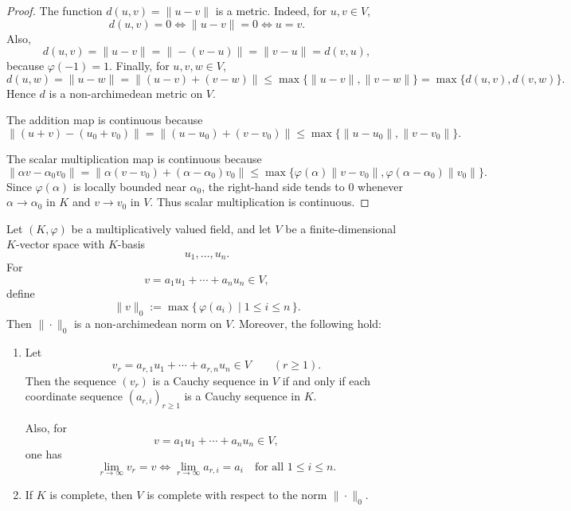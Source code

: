 \begin{proof}
    The function \(d(u,v)=\|u-v\|\) is a metric. Indeed, for \(u,v\in V\),
    \[
        d(u,v)=0
        \Longleftrightarrow
        \|u-v\|=0
        \Longleftrightarrow
        u=v.
    \]
    Also,
    \[
        d(u,v)=\|u-v\|=\|-(v-u)\|=\|v-u\|=d(v,u),
    \]
    because \(\varphi(-1)=1\). Finally, for \(u,v,w\in V\),
    \[
        d(u,w)
        =
        \|u-w\|
        =
        \|(u-v)+(v-w)\|
        \leq
        \max\{\|u-v\|,\|v-w\|\}
        =
        \max\{d(u,v),d(v,w)\}.
    \]
    Hence \(d\) is a non-archimedean metric on \(V\).

    The addition map is continuous because
    \[
        \|(u+v)-(u_0+v_0)\|
        =
        \|(u-u_0)+(v-v_0)\|
        \leq
        \max\{\|u-u_0\|,\|v-v_0\|\}.
    \]

    The scalar multiplication map is continuous because
    \[
        \|\alpha v-\alpha_0v_0\|
        =
        \|\alpha(v-v_0)+(\alpha-\alpha_0)v_0\|
        \leq
        \max\{\varphi(\alpha)\|v-v_0\|,
               \varphi(\alpha-\alpha_0)\|v_0\|\}.
    \]
    Since \(\varphi(\alpha)\) is locally bounded near \(\alpha_0\), the right-hand side
    tends to \(0\) whenever \(\alpha\to\alpha_0\) in \(K\) and \(v\to v_0\) in \(V\).
    Thus scalar multiplication is continuous.
\end{proof}

\begin{lemma}
    Let \((K,\varphi)\) be a multiplicatively valued field, and let \(V\) be a
    finite-dimensional \(K\)-vector space with \(K\)-basis
    \[
        u_1,\dots,u_n.
    \]
    For
    \[
        v=a_1u_1+\cdots+a_nu_n\in V,
    \]
    define
    \[
        \|v\|_0:=\max\{\,\varphi(a_i)\mid 1\leq i\leq n\,\}.
    \]
    Then \(\|\cdot\|_0\) is a non-archimedean norm on \(V\). Moreover, the following
    hold:
    \begin{enumerate}
        \item Let
              \[
                  v_r=a_{r,1}u_1+\cdots+a_{r,n}u_n\in V
                  \qquad (r\geq 1).
              \]
              Then the sequence \((v_r)\) is a Cauchy sequence in \(V\) if and only if
              each coordinate sequence \((a_{r,i})_{r\geq 1}\) is a Cauchy sequence in
              \(K\).

              Also, for
              \[
                  v=a_1u_1+\cdots+a_nu_n\in V,
              \]
              one has
              \[
                  \lim_{r\to\infty} v_r=v
                  \Longleftrightarrow
                  \lim_{r\to\infty} a_{r,i}=a_i
                  \quad\text{for all }1\leq i\leq n.
              \]

        \item If \(K\) is complete, then \(V\) is complete with respect to the norm
              \(\|\cdot\|_0\).
    \end{enumerate}
\end{lemma}

